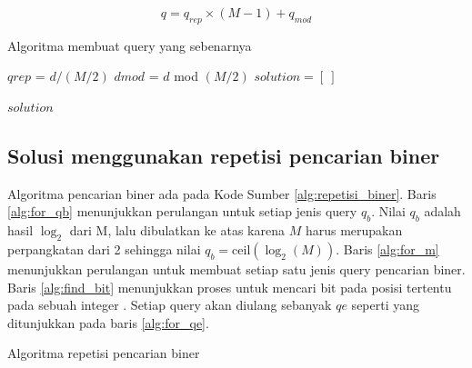 \begin{equation}
\label{eq:total_query}
q = q_{rep} \times (M-1) + q_{mod}
\end{equation}

\begin{algorithm}[h]
\caption{Algoritma membuat query yang sebenarnya}
\label{alg:actual_query}
  $qrep$ = $d/(M/2)$\;
  $dmod$ = $d$ mod $(M/2)$\;
  $solution = [\ ]$\;


  \Return $solution$\;
\end{algorithm}

\subsection{Solusi menggunakan repetisi pencarian biner}

Algoritma pencarian biner ada pada Kode Sumber \ref{alg:repetisi_biner}. Baris \ref{alg:for_qb} menunjukkan perulangan untuk setiap jenis query $q_b$. Nilai $q_b$ adalah hasil $\log_2$ dari M, lalu dibulatkan ke atas karena $M$ harus merupakan perpangkatan dari 2 sehingga nilai $q_b = \text{ceil}(\log_2(M))$. Baris \ref{alg:for_m} menunjukkan perulangan untuk membuat setiap satu jenis query pencarian biner. Baris \ref{alg:find_bit} menunjukkan proses untuk mencari bit pada posisi tertentu pada sebuah integer \cite{bithack}. Setiap query akan diulang sebanyak $qe$ seperti yang ditunjukkan pada baris \ref{alg:for_qe}.

\begin{algorithm}[h]
\caption{Algoritma repetisi pencarian biner}
\label{alg:repetisi_biner}
\end{algorithm}


